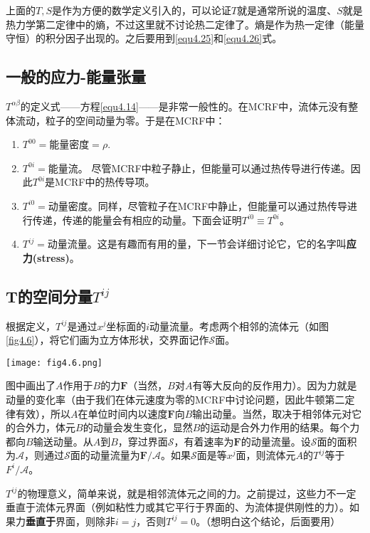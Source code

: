 上面的$T, S$是作为方便的数学定义引入的，可以论证$T$就是通常所说的温度、$S$就是热力学第二定律中的熵，不过这里就不讨论热二定律了。熵是作为热一定律（能量守恒）的积分因子出现的。之后要用到\eqref{equ4.25}和\eqref{equ4.26}式。


\subsection*{一般的应力-能量张量}
$T^{\alpha \beta}$的定义式——方程\eqref{equ4.14}——是非常一般性的。在MCRF中，流体元没有整体流动，粒子的空间动量为零。于是在MCRF中：
\begin{enumerate}
    \item $T^{00} = \text{能量密度} = \rho$. 
    \item $T^{0i} = \text{能量流。}$ 尽管MCRF中粒子静止，但能量可以通过热传导进行传递。因此$T^{0i}$是MCRF中的热传导项。
    \item $T^{i0} = \text{动量密度}$。同样，尽管粒子在MCRF中静止，但能量可以通过热传导进行传递，传递的能量会有相应的动量。下面会证明$T^{i0} \equiv T^{0i}$。
    \item $T^{ij} = \text{动量流量}$。这是有趣而有用的量，下一节会详细讨论它，它的名字叫\textbf{应力(stress)}。
\end{enumerate}

\subsection*{$\mathbf{T}$的空间分量$T^{ij}$}
根据定义，$T^{ij}$是通过$x^j$坐标面的$i$动量流量。考虑两个相邻的流体元（如图\ref{fig4.6}），将它们画为立方体形状，交界面记作$\mathscr{S}$面。

{
    \centering
    \texttt{[image: fig4.6.png]}
    \label{fig4.6}
}

图中画出了$A$作用于$B$的力$\bm{F}$（当然，$B$对$A$有等大反向的反作用力）。因为力就是动量的变化率（由于我们在体元速度为零的MCRF中讨论问题，因此牛顿第二定律有效），所以$A$在单位时间内以速度$\bm{F}$向$B$输出动量。当然，取决于相邻体元对它的合外力，体元$B$的动量会发生变化，显然$B$的运动是合外力作用的结果。每个力都向$B$输送动量。从$A$到$B$，穿过界面$\mathscr{S}$，有着速率为$\bm{F}$的动量流量。设$\mathscr{S}$面的面积为$\mathcal{A}$，则通过$\mathscr{S}$面的动量流量为$\bm{F} / \mathcal{A}$。如果$\mathscr{S}$面是等$x^j$面，则流体元$A$的$T^{ij}$等于$F^i / \mathcal{A}$。

$T^{ij}$的物理意义，简单来说，就是相邻流体元之间的力。之前提过，这些力不一定垂直于流体元界面（例如粘性力或其它平行于界面的、为流体提供刚性的力）。如果力\textbf{垂直于}界面，则除非$i = j$，否则$T^{ij} = 0$。（想明白这个结论，后面要用）

